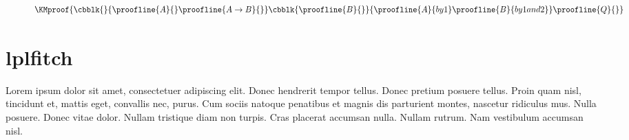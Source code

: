 \documentclass[class=article, crop=false]{standalone}
\begin{document}
\begin{figure*}
\[
  \KMproof{
    \cbblk{}{
      \proofline{A}{}
      \proofline{A \rightarrow B}{}
    }
    \cbblk{
      \proofline{B}{}
    }{
      \proofline{A}{by 1}
      \proofline{B}{by 1 and 2}
    }
    \proofline{Q}{}
  }
\]
\caption{\label{eq:nd1}}
\end{figure*}


\pagebreak
\section{lplfitch}

Lorem ipsum dolor sit amet, consectetuer adipiscing elit.  Donec hendrerit
tempor tellus.  Donec pretium posuere tellus.  Proin quam nisl, tincidunt et,
mattis eget, convallis nec, purus.  Cum sociis natoque penatibus et magnis dis
parturient montes, nascetur ridiculus mus.  Nulla posuere.  Donec vitae dolor.
Nullam tristique diam non turpis.  Cras placerat accumsan nulla.  Nullam rutrum.
Nam vestibulum accumsan nisl.



\begin{figure}
  \centering
  \caption{\label{eq:lpl1}}
\end{figure}


\IfStandalone{
  \nocite{*}
  
  
  }{}
\end{document}
